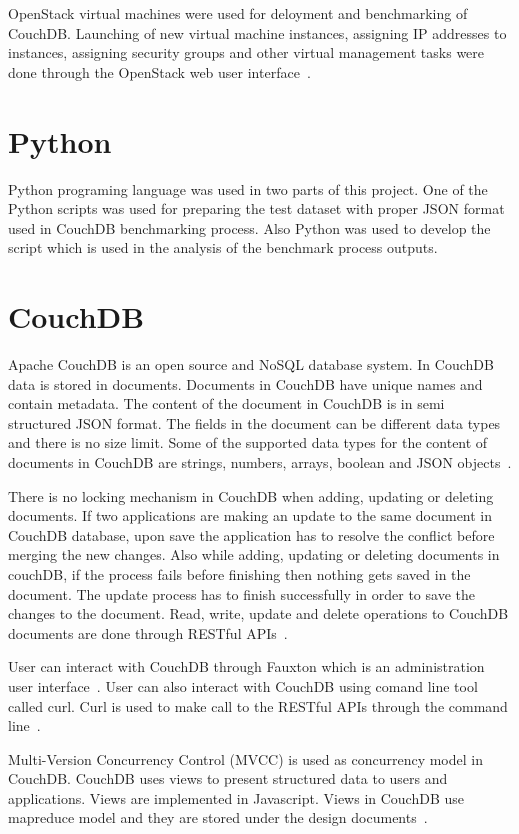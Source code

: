 OpenStack virtual machines were used for deloyment and benchmarking of
CouchDB. Launching of
new  virtual machine instances, assigning IP addresses to instances,
assigning security groups and other virtual management tasks were done
through the OpenStack web user interface~\cite{www-ChameleonDoc}. 


\section{Python}

Python programing language was used in two parts of this project. One
of the Python scripts was used for  preparing the test dataset with proper JSON format
used in CouchDB benchmarking process. Also Python was used to develop
the script which is used in the analysis of the benchmark process outputs.

\section{CouchDB}

Apache CouchDB is an open source and NoSQL database system. In CouchDB
data is stored in documents. Documents in CouchDB have unique names and contain
metadata. The content of the document in CouchDB is in semi structured
JSON format. The fields in the document can be different data types and there is no size
limit. Some of the supported data types for the content of documents
in CouchDB are strings, numbers, arrays, boolean and JSON objects~\cite{www-Couchdb}. 

There is no locking mechanism in CouchDB when adding,
updating or deleting documents. If two applications are making an
update to the same document in CouchDB database, upon save the
application has to resolve the conflict before merging the new
changes. Also while adding, updating or deleting documents in couchDB,
if the process fails before finishing then nothing gets saved in the
document. The update process has to finish successfully in order to
save the changes to the document. Read, write, update and delete
operations to CouchDB documents are done through RESTful
APIs~\cite{www-Couchdb}. 

User can interact with CouchDB through Fauxton which is
an administration user interface~\cite{www-Couchdb}. User can also
interact with CouchDB using  comand line tool called curl. Curl is
used to make call to the RESTful APIs through the command
line~\cite{www-CouchdbCurl}. 


Multi-Version Concurrency Control (MVCC) is used as concurrency model
in CouchDB. CouchDB uses views to present structured data to users and
applications. Views are implemented in Javascript. Views in CouchDB
use mapreduce model and they are stored under the design
documents~\cite{www-Couchdb}.  

